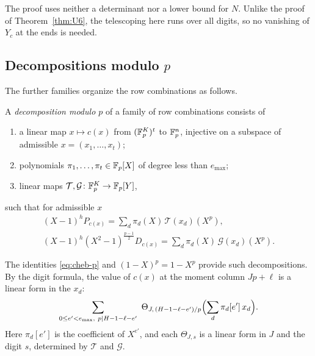 The proof uses neither a determinant nor a lower bound for $N$. Unlike the proof of Theorem~\ref{thm:U6}, the
telescoping here runs over all digits, so no vanishing of $Y_c$ at the ends is needed.

\subsection{Decompositions modulo $p$}
The further families organize the row combinations as follows.

\begin{definition}\label{def:slot}
A \emph{decomposition modulo $p$} of a family of row combinations consists of
\begin{enumerate}[label=(\alph*)]
\item a linear map $x\mapsto c(x)$ from $(\mathbb F_p^K)^t$ to $\mathbb F_p^n$, injective on a subspace of admissible
 $x=(x_1,\dots,x_t)$;
\item polynomials $\pi_1,\dots,\pi_t\in\mathbb F_p[X]$ of degree less than $e_{\max}$;
\item linear maps $\mathcal T,\mathcal G\colon\mathbb F_p^K\to\mathbb F_p[Y]$,
\end{enumerate}
such that for admissible $x$
\begin{gather*}
 (X-1)^hP_{c(x)}=\sum_d\pi_d(X)\,\mathcal T(x_d)(X^p),\\
 (X-1)^h(X^2-1)^{\frac{p-1}2}D_{c(x)}=\sum_d\pi_d(X)\,\mathcal G(x_d)(X^p).
\end{gather*}
\end{definition}

The identities \eqref{eq:cheb-p} and $(1-X)^p=1-X^p$ provide such decompositions. By the digit formula, the
value of $c(x)$ at the moment column $Jp+\ell$ is a linear form in the $x_d$:
\[
 \sum_{0\le e'<e_{\max},\ p\mid H-1-\ell-e'}\ \Theta_{J,\,(H-1-\ell-e')/p}\Bigl(\sum_d\pi_d[e']\,x_d\Bigr).
\]
Here $\pi_d[e']$ is the coefficient of $X^{e'}$, and each $\Theta_{J,s}$ is a linear form in $J$ and the digit
$s$, determined by $\mathcal T$ and $\mathcal G$.

